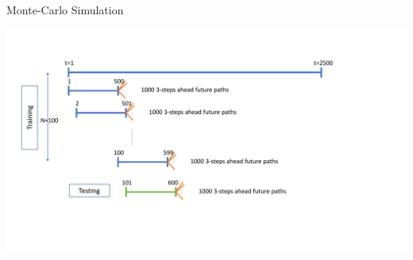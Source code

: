 \documentclass[11pt,xcolor=dvipsnames,handout]{beamer}
\begin{document}

\begin{frame}{Monte-Carlo Simulation}

\includegraphics[scale=0.4]{Figures/Optimisation_TestingG.pdf}

\end{frame}


\end{document}
